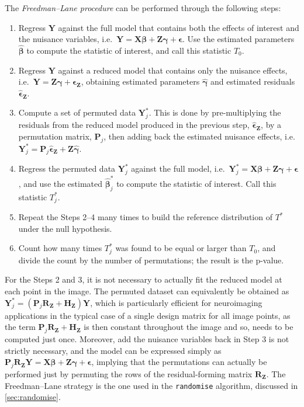 The \emph{Freedman--Lane procedure} \citep{Freedman1983} can be performed through the following steps:

\begin{enumerate}
\item Regress $\mathbf{Y}$ against the full model that contains both the effects of interest and the nuisance variables, i.e.\ $\mathbf{Y} = \mathbf{X}\boldsymbol{\beta} + \mathbf{Z}\boldsymbol{\gamma} + \boldsymbol{\epsilon}$. Use the estimated parameters $\boldsymbol{\hat{\beta}}$ to compute the statistic of interest, and call this statistic $T_{0}$.
\item Regress $\mathbf{Y}$ against a reduced model that contains only the nuisance effects, i.e.\ $\mathbf{Y} = \mathbf{Z}\boldsymbol{\gamma} + \boldsymbol{\epsilon}_{\mathbf{Z}}$, obtaining estimated parameters $\boldsymbol{\hat{\gamma}}$ and estimated residuals $\boldsymbol{\hat{\epsilon}}_{\mathbf{Z}}$.
\item Compute a set of permuted data $\mathbf{Y}^{*}_{j}$. This is done by pre-multiplying the residuals from the reduced model produced in the previous step, $\boldsymbol{\hat{\epsilon}}_{\mathbf{Z}}$, by a permutation matrix, $\mathbf{P}_{j}$, then adding back the estimated nuisance effects, i.e.\ $\mathbf{Y}^{*}_{j} = \mathbf{P}_{j}\boldsymbol{\hat{\epsilon}}_{\mathbf{Z}} + \mathbf{Z}\boldsymbol{\hat{\gamma}}$. 
\item Regress the permuted data $\mathbf{Y}^{*}_{j}$ against the full model, i.e.\ $\mathbf{Y}^{*}_{j} = \mathbf{X}\boldsymbol{\beta} + \mathbf{Z}\boldsymbol{\gamma} + \boldsymbol{\epsilon}$, and use the estimated $\boldsymbol{\hat{\beta}}^{*}_{j}$ to compute the statistic of interest. Call this statistic $T^{*}_{j}$.
\item Repeat the Steps 2--4 many times to build the reference distribution of $T^{*}$ under the null hypothesis.
\item Count how many times $T^{*}_{j}$ was found to be equal or larger than $T_{0}$, and divide the count by the number of permutations; the result is the p-value.
\end{enumerate}

For the Steps 2 and 3, it is not necessary to actually fit the reduced model at each point in the image. The permuted dataset can equivalently be obtained as $\mathbf{Y}^{*}_{j} = \left(\mathbf{P}_{j}\mathbf{R}_{\mathbf{Z}}+\mathbf{H}_{\mathbf{Z}}\right)\mathbf{Y}$, which is particularly efficient for neuroimaging applications in the typical case of a single design matrix for all image points, as the term $\mathbf{P}_{j}\mathbf{R}_{\mathbf{Z}}+\mathbf{H}_{\mathbf{Z}}$ is then constant throughout the image and so, needs to be computed just once. Moreover, add the nuisance variables back in Step 3 is not strictly necessary, and the model can be expressed simply as $\mathbf{P}_{j}\mathbf{R}_{\mathbf{Z}}\mathbf{Y}=\mathbf{X}\boldsymbol{\beta}+\mathbf{Z}\boldsymbol{\gamma}+\boldsymbol{\epsilon}$, implying that the permutations can actually be performed just by permuting the rows of the residual-forming matrix $\mathbf{R}_{\mathbf{Z}}$. The Freedman--Lane strategy is the one used in the \texttt{randomise} algorithm, discussed in \ref{sec:randomise}.

